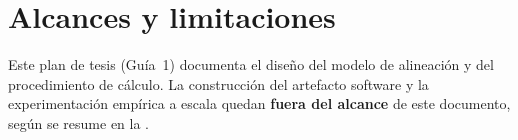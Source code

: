 \section{Alcances y limitaciones}
\label{sec:alcances}

Este plan de tesis (Guía~1) documenta el diseño del modelo de alineación y del procedimiento de
cálculo. La construcción del artefacto software y la experimentación empírica a escala quedan
\textbf{fuera del alcance} de este documento, según se resume en la .



